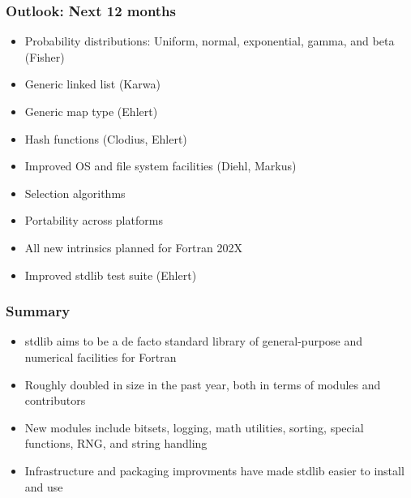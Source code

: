\documentclass[aspectratio=169]{beamer}
\begin{document}
\begin{frame}
  \frametitle{Outlook: Next 12 months}

  \begin{itemize}
  \item Probability distributions: Uniform, normal, exponential, gamma, and beta (Fisher)
  \item Generic linked list (Karwa)
  \item Generic map type (Ehlert)
  \item Hash functions (Clodius, Ehlert)
  \item Improved OS and file system facilities (Diehl, Markus)
  \item Selection algorithms
  \item Portability across platforms
  \item All new intrinsics planned for Fortran 202X
  \item Improved stdlib test suite (Ehlert)
  \end{itemize}

\end{frame}


\begin{frame}
  \frametitle{Summary}

  \begin{itemize}
  \item stdlib aims to be a de facto standard library of general-purpose and numerical facilities for Fortran
  \item Roughly doubled in size in the past year, both in terms of modules and contributors
  \item New modules include bitsets, logging, math utilities, sorting, special functions, RNG, and string handling
  \item Infrastructure and packaging improvments have made stdlib easier to install and use
  \end{itemize}
\end{frame}
\end{document}
